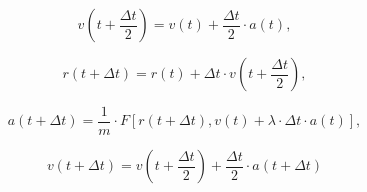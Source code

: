 \documentclass[12pt]{article}
\begin{document}
$$
  v(t+\frac{\Delta t}{2}) = v(t) + \frac{\Delta t}{2}\cdot a(t),
$$

$$
  r(t+\Delta t) = r(t) + \Delta t\cdot v(t+\frac{\Delta t}{2}),
$$

$$
  a(t+\Delta t) = \frac{1}{m}\cdot F\left[ r(t+\Delta t), v(t) +\lambda \cdot \Delta t\cdot a(t)\right],
$$

$$
  v(t+\Delta t) = v(t+\frac{\Delta t}{2}) + \frac{\Delta t}{2}\cdot a(t+\Delta t)
$$
\end{document}

